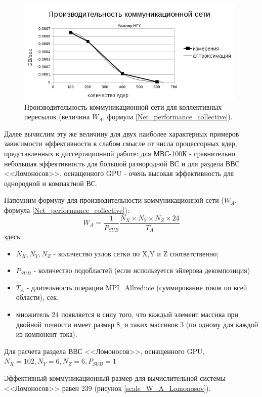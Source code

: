 \begin{figure}[h]
	
	
	\begin{center}
		\includegraphics[height=5cm,keepaspectratio]{images/scaleNSU_exp_fit.png}
		\caption{
			Производительность коммуникационной сети для коллективных пересылок (величина $W_A$, формула \ref{Net_performance_collective}). 
		}
		\label{scale_W_A_exp}
	\end{center} 
\end{figure}

Далее вычислим эту же величину для двух наиболее характерных примеров зависимости эффективности в слабом смысле от числа процессорных ядер, представленных в диссертационной работе: для МВС-100К - сравнительно небольшая эффективность для большой разнородной ВС и для раздела ВВС <<Ломоносов>>, оснащенного GPU - очень высокая эффективность для однородной и компактной ВС. 

Напомним формулу для производительности коммуникационной сети ($W_A$, формула \ref{Net_performance_collective}):
$$
W_A = \frac{1}{P_{SUB}}\frac{N_X\times N_Y \times N_Z \times 24}{T_A}
$$
здесь:
\begin{itemize}
	\item $N_X, N_Y, N_Z$ - количество узлов сетки по X,Y и Z соответственно;
	\item $P_{SUB}$ - количество подобластей (если используется эйлерова декомпозиция)
	\item $T_{A}$ - длительность операции MPI\_Allreduce (суммирование токов по всей области), сек.
	\item множитель 24 появляется в силу того, что каждый элемент массива при двойной точности имеет размер 8, и таких массивов 3 (по одному для каждой из компонент тока).
\end{itemize}	

Для расчета раздела ВВС <<Ломоносов>>, оснащенного GPU, $N_X = 102, N_Y = 6, N_Z = 6, P_{SUB}  = 1$

 Эффективный коммуникационный размер для вычислительной системы  <<Ломоносов>> равен 239 (рисунок \ref{scale_W_A_Lomonosov}).


